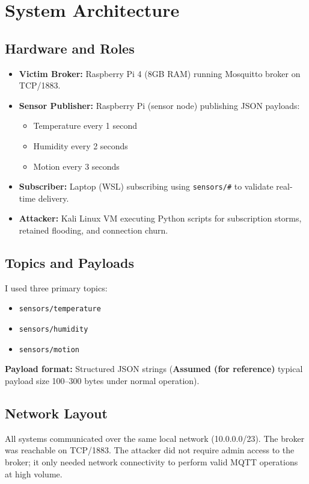 \documentclass[11pt]{article}
\begin{document}
\section{System Architecture}
\subsection{Hardware and Roles}
\begin{itemize}
  \item \textbf{Victim Broker:} Raspberry Pi 4 (8GB RAM) running Mosquitto broker on TCP/1883.
  \item \textbf{Sensor Publisher:} Raspberry Pi (sensor node) publishing JSON payloads:
  \begin{itemize}
    \item Temperature every 1 second
    \item Humidity every 2 seconds
    \item Motion every 3 seconds
  \end{itemize}
  \item \textbf{Subscriber:} Laptop (WSL) subscribing using \texttt{sensors/\#} to validate real-time delivery.
  \item \textbf{Attacker:} Kali Linux VM executing Python scripts for subscription storms, retained flooding, and connection churn.
\end{itemize}

\subsection{Topics and Payloads}
I used three primary topics:
\begin{itemize}
  \item \texttt{sensors/temperature}
  \item \texttt{sensors/humidity}
  \item \texttt{sensors/motion}
\end{itemize}

\textbf{Payload format:} Structured JSON strings (\textbf{Assumed (for reference)} typical payload size 100--300 bytes under normal operation).

\subsection{Network Layout}
All systems communicated over the same local network (10.0.0.0/23). The broker was reachable on TCP/1883. The attacker did not require admin access to the broker; it only needed network connectivity to perform valid MQTT operations at high volume.
\end{document}
